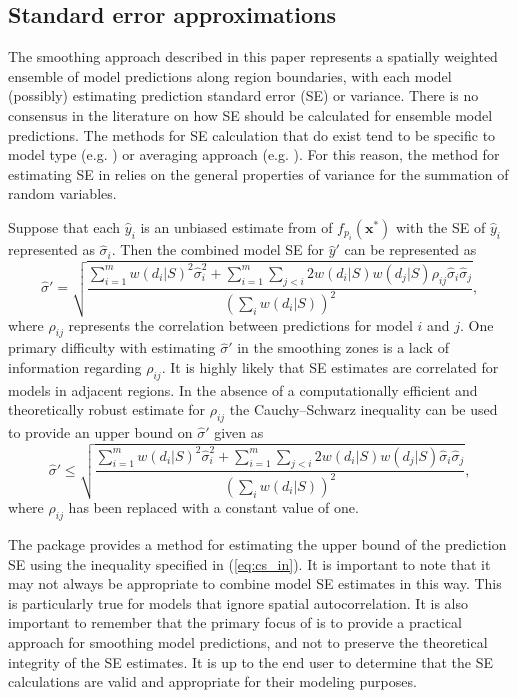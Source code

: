 \subsection{Standard error approximations}

The smoothing approach described in this paper represents a spatially weighted ensemble of model predictions along region boundaries, with each model (possibly) estimating prediction standard error (SE) or variance. There is no consensus in the literature on how SE should be calculated for ensemble model predictions. The methods for SE calculation that do exist tend to be specific to model type (e.g. \cite{wager2014confidence}) or averaging approach (e.g. \cite{hoeting1999bayesian}). For this reason, the method for estimating SE in  relies on the general properties of variance for the summation of random variables.

Suppose that each $\hat{y}_i$ is an unbiased estimate from of $f_{p_i}(\pmb{x}^*)$ with the SE of $\hat{y}_i$ represented as $\hat{\sigma}_i$. Then the combined model SE for $\hat{y}'$ can be represented as 
%
\begin{equation}
     \hat{\sigma}' = \sqrt{\frac{\sum_{i=1}^m w(d_i|S)^2\hat{\sigma}_{i}^2 + \sum_{i=1}^m\sum_{j<i} 2w(d_i|S)w(d_j|S)\rho_{ij}\hat{\sigma}_{i}\hat{\sigma}_{j}}{\left(\sum_i w(d_i|S)\right)^2}},
\end{equation}
%
where $\rho_{ij}$ represents the correlation between predictions for model $i$ and $j$. One primary difficulty with estimating $\hat{\sigma}'$ in the smoothing zones is a lack of information regarding $\rho_{ij}$. It is highly likely that SE estimates are correlated for models in adjacent regions. In the absence of a computationally efficient and theoretically robust estimate for $\rho_{ij}$ the Cauchy–Schwarz inequality can be used to provide an upper bound on $\hat{\sigma}'$ given as 
%
\begin{equation}
     \hat{\sigma}' \le \sqrt{\frac{\sum_{i=1}^m w(d_i|S)^2\hat{\sigma}_{i}^2 + \sum_{i=1}^m\sum_{j<i} 2w(d_i|S)w(d_j|S)\hat{\sigma}_{i}\hat{\sigma}_{j}}{\left(\sum_i w(d_i|S)\right)^2}},
     \label{eq:cs_in}
\end{equation}
%
where $\rho_{ij}$ has been replaced with a constant value of one. 

The  package provides a method for estimating the upper bound of the prediction SE using the inequality specified in (\ref{eq:cs_in}). It is important to note that it may not always be appropriate to combine model SE  estimates in this way. This is particularly true for models that ignore spatial autocorrelation. It is also important to remember that the primary focus of  is to provide a practical approach for smoothing model predictions, and not to preserve the theoretical integrity of the SE estimates. It is up to the end user to determine that the SE calculations are valid and appropriate for their modeling purposes.  

